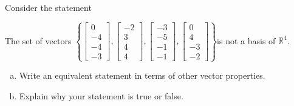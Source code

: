 
\begin{exerciseStatement}


Consider the statement 
\begin{center}\begin{minipage}{0.8\textwidth}
 The set of vectors \( \left\{ \left[\begin{array}{c}
0 \\
-4 \\
-4 \\
-3
\end{array}\right] , \left[\begin{array}{c}
-2 \\
3 \\
4 \\
4
\end{array}\right] , \left[\begin{array}{c}
-3 \\
-5 \\
-1 \\
-1
\end{array}\right] , \left[\begin{array}{c}
0 \\
4 \\
-3 \\
-2
\end{array}\right] \right\} \)is not a basis of \(\mathbb{R}^4\). 
\end{minipage}\end{center}
    


\begin{enumerate}[(a)]
\item  Write an equivalent statement in terms of other vector properties.
\item  Explain why your statement is true or false.
\end{enumerate}
    
\end{exerciseStatement}
    
